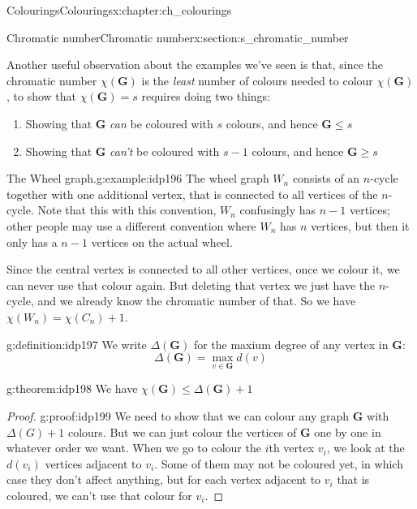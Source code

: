 \documentclass[oneside,10pt,]{book}
\numberwithin{equation}{section}
\newcommand{\bfG}{\mathbf{G}}
\begin{document}
\begin{chapterptx}{Colourings}{}{Colourings}{}{}{x:chapter:ch_colourings}
\begin{sectionptx}{Chromatic number}{}{Chromatic number}{}{}{x:section:s_chromatic_number}
\par
Another useful observation about the examples we've seen is that, since the chromatic number \(\chi(\bfG)\) is the \emph{least} number of colours needed to colour \(\chi(\bfG)\), to show that \(\chi(\bfG)=s\) requires doing two things:%
\begin{enumerate}
\item{}Showing that \(\bfG\) \emph{can} be coloured with \(s\) colours, and hence \(\bfG\leq s\)%
\item{}Showing that \(\bfG\) \emph{can't} be coloured with \(s-1\) colours, and hence \(\bfG\geq s\)%
\end{enumerate}
%
\begin{example}{The Wheel graph.}{g:example:idp196}%
The wheel graph \(W_n\) consists of an \(n\)-cycle together with one additional vertex, that is connected to all vertices of the \(n\)-cycle.  Note that this with this convention, \(W_n\) confusingly has \(n-1\) vertices; other people may use a different convention where \(W_n\) has \(n\) vertices, but then it only has a \(n-1\) vertices on the actual wheel.%
\par
Since the central vertex is connected to all other vertices, once we colour it, we can never use that colour again.  But deleting that vertex we just have the \(n\)-cycle, and we already know the chromatic number of that.  So we have \(\chi(W_n)=\chi(C_n)+1\).%
\end{example}
\begin{definition}{}{g:definition:idp197}%
We write \(\Delta(\bfG)\) for the maxium degree of any vertex in \(\bfG\):%
\begin{equation*}
\Delta(\bfG)=\max_{v\in \bfG} d(v)
\end{equation*}
%
\end{definition}
\begin{theorem}{}{}{g:theorem:idp198}%
We have \(\chi(\bfG)\leq \Delta(\bfG)+1\)%
\end{theorem}
\begin{proof}{}{g:proof:idp199}
We need to show that we can colour any graph \(\bfG\) with \(\Delta(G)+1\) colours.  But we can just colour the vertices of \(\bfG\) one by one in whatever order we want.  When we go to colour the \(i\)th vertex \(v_i\), we look at the \(d(v_i)\) vertices adjacent to \(v_i\).  Some of them may not be coloured yet, in which case they don't affect anything, but for each vertex adjacent to \(v_i\) that is coloured, we can't use that colour for \(v_i\).%
\par

\end{proof}
\end{sectionptx}
\end{chapterptx}
\end{document}
